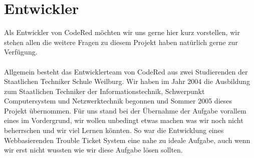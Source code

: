 \chapter{Entwickler}  %
\label{chapter:Entwickler}  %

Als Entwickler von CodeRed möchten wir uns gerne hier kurz vorstellen, wir stehen allen die weitere Fragen zu diesem Projekt haben natürlich gerne zur Verfügung. \\
\\
Allgemein besteht das Entwicklerteam von CodeRed aus zwei Studierenden der Staatlichen Techniker Schule Weilburg. Wir haben im Jahr 2004 die Ausbildung zum Staatlichen Techniker der Informationstechnik, Schwerpunkt Computersystem und Netzwerktechnik begonnen und Sommer 2005 dieses Projekt übernommen. Für uns stand bei der Übernahme der Aufgabe vorallem eines im Vordergrund, wir wollen unbedingt etwas machen was wir noch nicht beherrschen und wir viel Lernen könnten. So war die Entwicklung eines Webbasierenden Trouble Ticket System eine nahe zu ideale Aufgabe, auch wenn wir erst nicht wussten wie wir diese Aufgabe lösen sollten.\\   
\newpage
